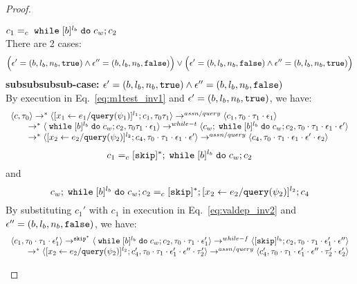 {\begin{proof}
%
\begin{subproof} $c_1 =_c \;\mathtt{while}\; [b]^{l_b} \;\mathtt{do}\; c_w;{c}_2$ 
%
\\
There are 2 cases:
$$
\Big(\mathtt{\epsilon}' = (b, l_b, n_b, \mathtt{true}) \land \mathtt{\epsilon}'' = (b, l_b, n_b, \mathtt{false}) \Big)
\lor 
\Big(\mathtt{\epsilon}' = (b, l_b, n_b, \mathtt{false}) \land \mathtt{\epsilon}'' = (b, l_b, n_b, \mathtt{true}) \Big)
$$
%
\textbf{subsubsubsub-case:} $\mathtt{\epsilon}' = (b, l_b, n_b, \mathtt{true}) \land \mathtt{\epsilon}'' = (b, l_b, n_b, \mathtt{false})$
\\
By execution in Eq.~\ref{eq:m1test_inv1} and $\mathtt{\epsilon}' = (b, l_b, n_b, \mathtt{true})$, we have:
\[
  \begin{array}{l}   
  \langle {c}, \mathtt{\tau}_0 \rangle \rightarrow^{*} 
  \langle [\mathrel{ {x}_1 \leftarrow e_1 / {\tt query}(\psi_1) }]^{l_1} ; {c}_1, \mathtt{\tau}_0 \mathtt{\tau}_1 \rangle  
  \rightarrow^{assn/query}
  \langle c_1, \mathtt{\tau}_0 \cdot \mathtt{\tau}_1 \cdot \mathtt{\epsilon}_1 \rangle 
  \\
  \qquad \rightarrow^{*} 
  \langle \;\mathtt{while}\; [b]^{l_b} \;\mathtt{do}\; c_w;{c}_2, 
  \mathtt{\tau}_0 \mathtt{\tau}_1 \cdot \mathtt{\epsilon}_1 \rangle 
  \rightarrow^{while-t} 
  \langle c_w;\;\mathtt{while}\; [b]^{l_b} \;\mathtt{do}\; c_w; c_2, \mathtt{\tau}_0 \cdot \mathtt{\tau}_1 \cdot \mathtt{\epsilon}_1 \cdot \mathtt{\epsilon}' \rangle 
  \\
  \qquad \rightarrow^{*} 
  \langle [\mathrel{ {x}_2 \leftarrow e_2 / {\tt query}(\psi_2) }]^{l_2};{c}_4, 
  \mathtt{\tau}_0 \cdot \mathtt{\tau}_1 \cdot \mathtt{\epsilon}_1 \cdot \mathtt{\epsilon}' \rangle 
  \rightarrow^{assn/query} 
  \langle {c}_4,  \mathtt{\tau}_0 \cdot \mathtt{\tau}_1 \cdot \mathtt{\epsilon}_1 \cdot \mathtt{\epsilon}' \cdot \mathtt{\epsilon}_2 \rangle 
  \end{array}
\]
% 
\[
  c_1 =_c [\mathtt{skip}]{}^*; \;\mathtt{while}\; [b]^{l_b} \;\mathtt{do}\; c_w;{c}_2
\]
and
\[
  c_w;\;\mathtt{while}\; [b]^{l_b} \;\mathtt{do}\; c_w; c_2 =_c [\mathtt{skip}]{}^*;[\mathrel{ {x}_2 \leftarrow e_2 / {\tt query}(\psi_2) }]^{l_2};{c}_4
\]
%
By substituting $c_1'$ with $c_1$ in execution in Eq.~\ref{eq:valdep_inv2} and $\mathtt{\epsilon}'' = (b, l_b, n_b, \mathtt{false})$, we have:
  \[
  \begin{array}{l}   
  \langle c_1, \mathtt{\tau}_0 \cdot \mathtt{\tau}_1 \cdot \mathtt{\epsilon}_1' \rangle 
  \rightarrow^{\mathtt{skip}^*} 
  \langle \;\mathtt{while}\; [b]^{l_b} \;\mathtt{do}\; c_w;{c}_2, \mathtt{\tau}_0 \cdot \mathtt{\tau}_1 \cdot \mathtt{\epsilon}_1' \rangle 
  \rightarrow^{while-f} 
  \langle [\mathtt{skip}]^{l_b};c_2, \mathtt{\tau}_0 \cdot \mathtt{\tau}_1 \cdot \mathtt{\epsilon}_1' \cdot \mathtt{\epsilon}'' \rangle 
  \\
  \qquad \rightarrow^{*} 
  \langle [\mathrel{ {x}_2 \leftarrow e_2 / {\tt query}(\psi_2) }]^{l_2};{c}_4', 
  \mathtt{\tau}_0 \cdot \mathtt{\tau}_1 \cdot \mathtt{\epsilon}_1' \cdot \mathtt{\epsilon}'' \cdot \mathtt{\tau}_2' \rangle
  \rightarrow^{assn/query} 
  \langle {c}_4',  \mathtt{\tau}_0 \cdot \mathtt{\tau}_1 \cdot \mathtt{\epsilon}_1' \cdot \mathtt{\epsilon}'' \cdot \mathtt{\tau}_2' \cdot \mathtt{\epsilon}_2' \rangle 
\end{array}
\]
\end{subproof}
\end{proof}}
